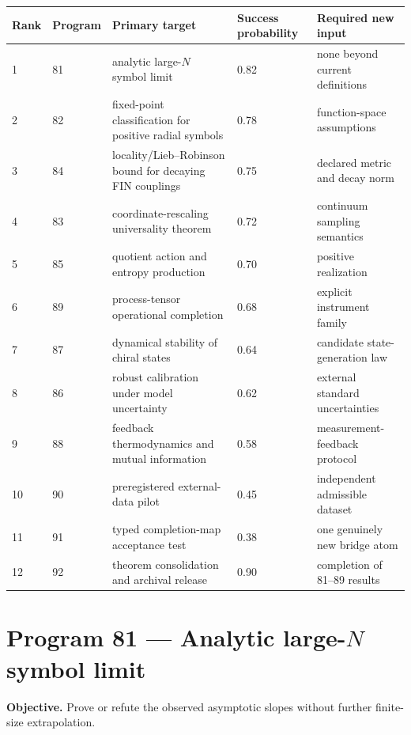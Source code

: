 \documentclass[11pt,a4paper,openany]{report}
\begin{document}
\begin{center}
\begingroup\footnotesize
\setlength{\tabcolsep}{3.5pt}
\renewcommand{\arraystretch}{1.16}
\begin{longtable}{@{}p{}p{}p{}p{}p{}@{}}
\toprule
\textbf{Rank} & \textbf{Program} & \textbf{Primary target} & \textbf{Success probability} & \textbf{Required new input} \\
\midrule
\endhead
1 & 81 & analytic large-\(N\) symbol limit & 0.82 & none beyond current definitions \\
2 & 82 & fixed-point classification for positive radial symbols & 0.78 & function-space assumptions \\
3 & 84 & locality/\allowbreak{}Lieb--Robinson bound for decaying FIN couplings & 0.75 & declared metric and decay norm \\
4 & 83 & coordinate-rescaling universality theorem & 0.72 & continuum sampling semantics \\
5 & 85 & quotient action and entropy production & 0.70 & positive realization \\
6 & 89 & process-tensor operational completion & 0.68 & explicit instrument family \\
7 & 87 & dynamical stability of chiral states & 0.64 & candidate state-generation law \\
8 & 86 & robust calibration under model uncertainty & 0.62 & external standard uncertainties \\
9 & 88 & feedback thermodynamics and mutual information & 0.58 & measurement-feedback protocol \\
10 & 90 & preregistered external-data pilot & 0.45 & independent admissible dataset \\
11 & 91 & typed completion-map acceptance test & 0.38 & one genuinely new bridge atom \\
12 & 92 & theorem consolidation and archival release & 0.90 & completion of 81--89 results \\
\bottomrule
\end{longtable}
\endgroup
\end{center}

\section{\texorpdfstring{Program 81 --- Analytic large-\(N\) symbol limit}{Program 81 --- Analytic large-N symbol limit}}

\textbf{Objective.} Prove or refute the observed asymptotic slopes without further finite-size extrapolation.
\end{document}
